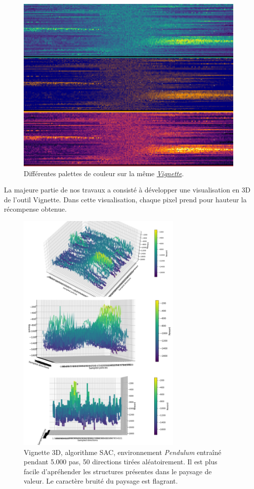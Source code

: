 \documentclass[12pt]{article}
\begin{document}
\begin{figure}[htp]
    \centering
    \includegraphics[width=15cm]{Images/palette}
    \caption{Différentes palettes de couleur sur la même \hyperref[fig:vignettePendulum]{\emph{Vignette}}.}
    \label{fig:palette}
\end{figure}

La majeure partie de nos travaux a consisté à développer une visualisation en 3D de l'outil Vignette. Dans cette visualisation, chaque pixel prend pour hauteur la récompense obtenue. \\

\begin{figure}[htp]
    \centering
    \includegraphics[width=8cm]{Images/vignette_3D}
    \caption{Vignette 3D, algorithme SAC, environnement \emph{Pendulum} entraîné pendant 5.000 pas, 50 directions tirées aléatoirement. Il est plus facile d'apréhender les structures présentes dans le paysage de valeur. Le caractère bruité du paysage est flagrant.}
    \label{fig:vignette3D}
\end{figure}
\end{document}
